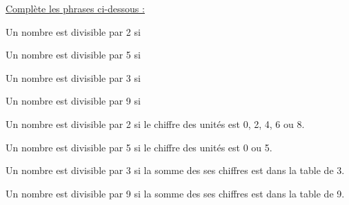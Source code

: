 \underline {Complète les phrases ci-dessous :}
\begin{myenumerate}
 \item Un nombre est divisible par 2 si \dotfill
 \item Un nombre est divisible par 5 si \dotfill
 \item Un nombre est divisible par 3 si \dotfill
 \item Un nombre est divisible par 9 si \dotfill
\end{myenumerate}
\begin{myenumerate}
 \item Un nombre est divisible par 2 si le chiffre des unités est 0, 2, 4, 6 ou 8.
 \item Un nombre est divisible par 5 si le chiffre des unités est 0 ou 5.
 \item Un nombre est divisible par 3 si la somme des ses chiffres est dans la table de 3.
 \item Un nombre est divisible par 9 si la somme des ses chiffres est dans la table de 9.
\end{myenumerate}